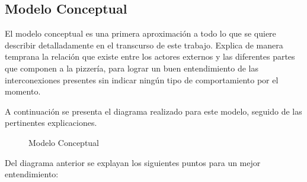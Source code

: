 \documentclass[a4paper,10pt]{article}
\begin{document}
\bigskip

\subsection*{Modelo Conceptual}

El modelo conceptual es una primera aproximaci\'on a todo lo que se quiere describir detalladamente en el transcurso de este trabajo. Explica 
de manera temprana la relaci\'on que existe entre los actores externos y las diferentes partes que componen a la pizzer\'ia, para lograr un buen
entendimiento de las interconexiones presentes sin indicar ning\'un tipo de comportamiento por el momento.

A continuaci\'on se presenta el diagrama realizado para este modelo, seguido de las pertinentes explicaciones.

\begin{figure}[H]
\centering
{}
\caption{Modelo Conceptual}
\end{figure}

\medskip

Del diagrama anterior se explayan los siguientes puntos para un mejor entendimiento:
\end{document}
